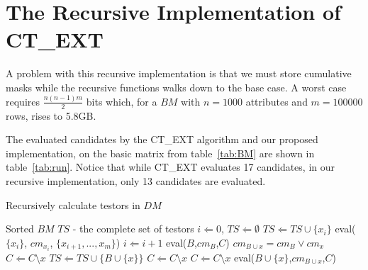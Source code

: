 \documentclass[citeauthoryear]{llncs}
\begin{document}
\section{The Recursive Implementation of CT\_EXT}
%
	A problem with this recursive implementation is that we must store cumulative masks while the recursive
	functions walks down to the base case. A worst case requires $\frac{n(n-1)m}{2}$ bits which, for a $BM$
	with $n=1000$ attributes and $m=100000$ rows, rises to 5.8GB. 
	
	The evaluated candidates by the CT\_EXT algorithm and our proposed implementation, on the basic matrix from
	table~\ref{tab:BM} are shown in table~\ref{tab:run}. Notice that while CT\_EXT evaluates 17 candidates,
	in our recursive implementation, only 13 candidates are evaluated.
	
	\renewcommand{\algorithmicrequire}{\textbf{Input:}}
	\renewcommand{\algorithmicensure}{\textbf{Output:}}
	\begin{algorithm}
	\caption{Recursively calculate testors in $DM$}
	\label{alg1}
	\begin{multicols}{2}
	\begin{algorithmic}
	  \REQUIRE Sorted $BM$
	  \ENSURE $TS$ - the complete set of testors
	  \STATE $i \Leftarrow 0$, $TS \Leftarrow \emptyset$
	  		\STATE $TS \Leftarrow TS\cup \lbrace x_i \rbrace$
	  	\ELSE
	  		\STATE eval($\lbrace x_i \rbrace$, $cm_{x_i}$, $\lbrace x_{i+1},..., x_m\rbrace$)
	  	\ENDIF
	  	\STATE $i \Leftarrow i+1$
	  \ENDWHILE
	  \STATE \STATE \STATE \STATE \STATE 
	  \STATE eval($B$,$cm_B$,$C$)
	  	\STATE $cm_{B\cup x}=cm_B \vee cm_x$
	  			\STATE $C \Leftarrow C\setminus x$	 
	  			\STATE $TS \Leftarrow TS\cup\lbrace B\cup \lbrace x\rbrace \rbrace$
	  		\ENDIF
	  	\ELSE
	  		\STATE $C \Leftarrow C\setminus x$
	  	\ENDIF
	  \ENDFOR
	  	\STATE $C \Leftarrow C\setminus x$
	  	\STATE eval($B\cup \lbrace x\rbrace$,$cm_{B\cup x}$,$C$)
	  \ENDFOR
	\end{algorithmic}
	\end{multicols}
	\end{algorithm}
	
\end{document}
